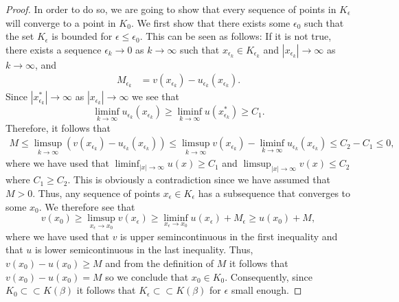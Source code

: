 \documentclass[11pt]{article}
\numberwithin{equation}{section}
\theoremstyle{definition}
\begin{document}
\begin{proof}
     In order to do so, we are going to show that every sequence of points in $K_{\epsilon}$ will converge to a point in $K_0$. We first show that there exists some $\epsilon_0$ such that the set $K_{\epsilon}$ is bounded for  $\epsilon \leq \epsilon_0$. This can be seen as follows: If it is not true, there exists a sequence ${\epsilon}_k \to 0$ as $k \to \infty$ such that $x_{{\epsilon}_k} \in K_{{\epsilon}_k}$ and $|x_{\epsilon_k}| \to \infty$ as $k \to \infty$, and
\begin{align*}
   M_{\epsilon_k} &=  v(x_{\epsilon_k})-u_{\epsilon_k}(x_{\epsilon_k}).
\end{align*}
Since $|x_{\epsilon_k}^*| \to \infty $ as $|x_{\epsilon_k}|\to \infty$ we see that
$$
\liminf_{k \to \infty} u_{\epsilon_k}(x_{\epsilon_k}) \geq \liminf_{k \to \infty} u(x_{\epsilon_k}^*)\geq C_1.
$$
 Therefore, it follows that
\begin{align*}
    M\leq \limsup_{k \to \infty} \left(v(x_{\epsilon_k})-u_{\epsilon_k}(x_{\epsilon_k})\right) \leq \limsup_{k \to \infty} v(x_{\epsilon_k}) - \liminf_{k\to \infty} u_{\epsilon_k}(x_{\epsilon_k}) \leq C_2-C_1 \leq 0,
\end{align*}
where we have used that $\liminf_{|x| \to \infty} u(x) \geq C_1$ and $\limsup_{|x| \to \infty} v(x) \leq C_2$ where $C_1 \geq C_2$. This is obviously a contradiction since we have assumed that $M >0$. Thus, any sequence of points $x_{\epsilon} \in K_{\epsilon}$ has a subsequence that converges to some $x_0$. We therefore see that
 $$
 v(x_0) \geq \limsup_{x_{\epsilon} \to x_0} v(x_{\epsilon}) \geq \liminf_{x_{\epsilon} \to x_0} u(x_{\epsilon}) + M_{\epsilon} \geq u(x_0) +M,
 $$
where we have used that $v$ is upper semincontinuous in the first inequality and that $u$ is lower semicontinuous in the last inequality. Thus, $v(x_0)-u(x_0) \geq M$ and from the definition of $M$ it follows that $v(x_0)-u(x_0) = M$ so we conclude that $x_0 \in K_0$. Consequently, since $K_0 \subset \subset K(\beta)$ it follows that $K_{\epsilon} \subset \subset K(\beta)$ for $\epsilon$ small enough.
\end{proof}
\end{document}
